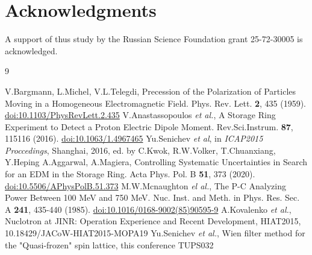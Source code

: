 \documentclass[a4paper,
               keeplastbox,   %
               ]{jacow}
\begin{document}
\section{Acknowledgments}

\par A support of thus study by the Russian Science Foundation grant 25-72-30005 is acknowledged.

	{\printbibliography}
	{
	\begin{thebibliography}{9}
	
	 V.Bargmann, L.Michel, V.L.Telegdi, Precession of the Polarization of Particles Moving in a Homogeneous Electromagnetic Field. Phys. Rev. Lett. \textbf{2}, 435 (1959). \url{doi:10.1103/PhysRevLett.2.435}
	 V.Anastassopoulos \emph{et al.}, A Storage Ring Experiment to Detect a Proton Electric Dipole Moment. Rev.Sci.Instrum. \textbf{87}, 115116 (2016). \url{doi:10.1063/1.4967465}
	 Yu.Senichev \emph{et al}, in \textit{ICAP2015 Proccedings}, Shanghai, 2016, ed. by C.Kwok, R.W.Volker, T.Chuanxiang, Y.Heping
	 A.Aggarwal, A.Magiera, Controlling Systematic Uncertainties in Search for an EDM in the Storage Ring. Acta Phys. Pol. B \textbf{51}, 373 (2020). \url{doi:10.5506/APhysPolB.51.373}
	 M.W.Mcnaughton \emph{el al.}, The P-C Analyzing Power Between 100 MeV and 750 MeV. Nuc. Inst. and Meth. in Phys. Res. Sec. A \textbf{241}, 435-440 (1985). \url{doi:10.1016/0168-9002(85)90595-9}
	 A.Kovalenko \emph{et al.}, Nuclotron at JINR: Operation Experience and Recent Development, HIAT2015, 10.18429/JACoW-HIAT2015-MOPA19
	 Yu.Senichev \emph{et al.}, Wien filter method for the "Quasi-frozen" spin lattice, this conference TUPS032
	
	\end{thebibliography}
}
\end{document}
